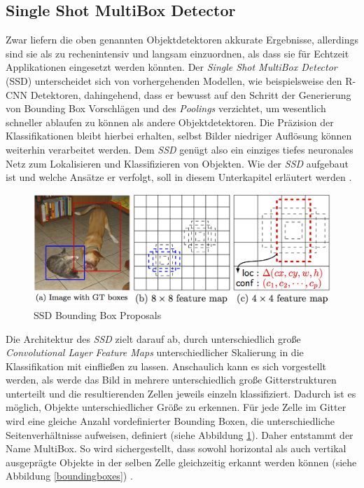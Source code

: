 \subsection*{Single Shot MultiBox Detector}

Zwar liefern die oben genannten Objektdetektoren akkurate Ergebnisse, allerdings sind sie als zu rechenintensiv und langsam einzuordnen, als dass sie für Echtzeit Applikationen eingesetzt werden könnten. Der \textit{Single Shot MultiBox Detector} (SSD) unterscheidet sich von vorhergehenden Modellen, wie beispielsweise den R-CNN Detektoren, dahingehend, dass er bewusst auf den Schritt der Generierung von Bounding Box Vorschlägen und des \textit{Poolings} verzichtet, um wesentlich schneller ablaufen zu können als andere Objektdetektoren. Die Präzision der Klassifikationen bleibt hierbei erhalten, selbst Bilder niedriger Auflösung können weiterhin verarbeitet werden. Dem \textit{SSD} genügt also ein einziges tiefes neuronales Netz zum Lokalisieren und Klassifizieren von Objekten. Wie der \textit{SSD} aufgebaut ist und welche Ansätze er verfolgt, soll in diesem Unterkapitel erläutert werden \cite{ssd.20161229}. 

\begin{figure}[ht]
	\begin{center}
		\includegraphics[width=15cm]{Bilder/ssd_framework.png} 
		\caption[SSD Bounding Box Proposals]{SSD Bounding Box Proposals \cite{ssd.20161229}}
		\label{framework}
	\end{center}
\end{figure}

Die Architektur des \textit{SSD} zielt darauf ab, durch unterschiedlich große \textit{Convolutional Layer} \textit{Feature Maps} unterschiedlicher Skalierung in die Klassifikation mit einfließen zu lassen. Anschaulich kann es sich vorgestellt werden, als werde das Bild in mehrere unterschiedlich große Gitterstrukturen unterteilt und die resultierenden Zellen jeweils einzeln klassifiziert. Dadurch ist es möglich, Objekte unterschiedlicher Größe zu erkennen. Für jede Zelle im Gitter wird eine gleiche Anzahl vordefinierter Bounding Boxen, die unterschiedliche Seitenverhältnisse aufweisen, definiert (siehe Abbildung \ref{framework}). Daher entstammt der Name \glqq MultiBox\grqq{}. So wird sichergestellt, dass sowohl horizontal als auch vertikal ausgeprägte Objekte in der selben Zelle gleichzeitig erkannt werden können (siehe Abbildung \ref{boundingboxes}) \cite{ssd.20161229}.


